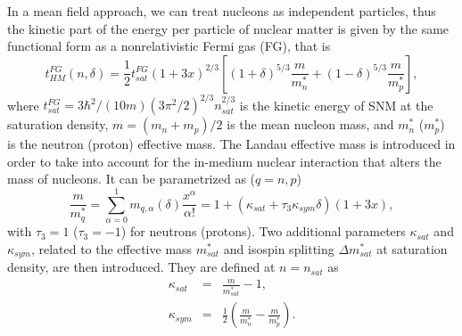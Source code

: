 In a mean field approach, we can treat nucleons as independent
particles, thus the kinetic part of the energy per particle of nuclear matter 
is given by the same functional form as a nonrelativistic Fermi gas (FG), that 
is
%
\begin{equation}
  t_{HM}^{FG}(n,\delta) =
  \frac{1}{2}t_{sat}^{FG}(1+3x)^{2/3}\left[(1+\delta)^{5/3}\frac{m}{m_n^*} +
  (1-\delta)^{5/3}\frac{m}{m_p^*}\right],
\end{equation}
%
where $t_{sat}^{FG} = 3\hbar^2/(10m)(3\pi^2/2)^{2/3}n_{sat}^{2/3}$ is the
kinetic energy of SNM at the saturation density, $m = (m_n + m_p)/2$ is the
mean nucleon mass, and $m_n^*$ ($m_p^*$) is the neutron (proton) effective
mass. The Landau effective mass is introduced in order to take into account for 
the in-medium nuclear interaction that alters the mass of nucleons. It can be
parametrized as ($q=n,p$)
%
\begin{equation}
  \frac{m}{m_q^*} = \sum_{\alpha=0}^1
  m_{q,\alpha}(\delta)\frac{x^\alpha}{\alpha!}
  = 1 + (\kappa_{sat} + \tau_3\kappa_{sym}\delta)(1+3x),\label{eq:effm}
\end{equation}
%
with $\tau_3 = 1$ ($\tau_3 = -1$) for neutrons (protons).
Two additional parameters $\kappa_{sat}$ and $\kappa_{sym}$, related to the 
effective mass $m_{sat}^*$ and isospin splitting $\Delta m_{sat}^*$ at 
saturation density, are then introduced. They are defined at $n = n_{sat}$ as
%
\begin{eqnarray}
  \kappa_{sat} &=& \frac{m}{m_{sat}^*} - 1,\\
  \kappa_{sym} &=& \frac{1}{2}\left(\frac{m}{m_n^*} - \frac{m}{m_p^*}\right).
\end{eqnarray}
%

